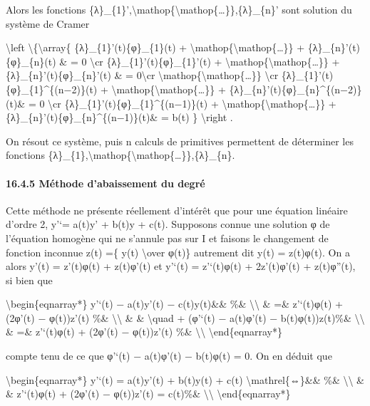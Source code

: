 \documentclass[]{article}
\begin{document}
Alors les fonctions
\{λ\}\_\{1\}',\textbackslash{}mathop\{\textbackslash{}mathop\{\ldots{}\}\},\{λ\}\_\{n\}'
sont solution du système de Cramer

\textbackslash{}left \textbackslash{}\{\textbackslash{}array\{
\{λ\}\_\{1\}'(t)\{φ\}\_\{1\}(t) +
\textbackslash{}mathop\{\textbackslash{}mathop\{\ldots{}\}\} +
\{λ\}\_\{n\}'(t)\{φ\}\_\{n\}(t) \& = 0 \textbackslash{}cr
\{λ\}\_\{1\}'(t)\{φ\}\_\{1\}'(t) +
\textbackslash{}mathop\{\textbackslash{}mathop\{\ldots{}\}\} +
\{λ\}\_\{n\}'(t)\{φ\}\_\{n\}'(t) \& = 0\textbackslash{}cr
\textbackslash{}mathop\{\textbackslash{}mathop\{\ldots{}\}\}
\textbackslash{}cr \{λ\}\_\{1\}'(t)\{φ\}\_\{1\}\^{}\{(n−2)\}(t) +
\textbackslash{}mathop\{\textbackslash{}mathop\{\ldots{}\}\} +
\{λ\}\_\{n\}'(t)\{φ\}\_\{n\}\^{}\{(n−2)\}(t)\& = 0 \textbackslash{}cr
\{λ\}\_\{1\}'(t)\{φ\}\_\{1\}\^{}\{(n−1)\}(t) +
\textbackslash{}mathop\{\textbackslash{}mathop\{\ldots{}\}\} +
\{λ\}\_\{n\}'(t)\{φ\}\_\{n\}\^{}\{(n−1)\}(t)\& = b(t) \}
\textbackslash{}right .

On résout ce système, puis n calculs de primitives permettent de
déterminer les fonctions
\{λ\}\_\{1\},\textbackslash{}mathop\{\textbackslash{}mathop\{\ldots{}\}\},\{λ\}\_\{n\}.

\paragraph{16.4.5 Méthode d'abaissement du degré}

Cette méthode ne présente réellement d'intérêt que pour une équation
linéaire d'ordre 2, y'`= a(t)y' + b(t)y + c(t). Supposons connue une
solution φ de l'équation homogène qui ne s'annule pas sur I et faisons
le changement de fonction inconnue z(t) =\{ y(t) \textbackslash{}over
φ(t)\} autrement dit y(t) = z(t)φ(t). On a alors y'(t) = z'(t)φ(t) +
z(t)φ'(t) et y'`(t) = z'`(t)φ(t) + 2z'(t)φ'(t) + z(t)φ''(t), si bien que

\textbackslash{}begin\{eqnarray*\} y'`(t) − a(t)y'(t) − c(t)y(t)\&\&
\%\& \textbackslash{}\textbackslash{} \& =\& z'`(t)φ(t) + (2φ'(t) −
φ(t))z'(t) \%\& \textbackslash{}\textbackslash{} \& \&
\textbackslash{}quad + (φ'`(t) − a(t)φ'(t) − b(t)φ(t))z(t)\%\&
\textbackslash{}\textbackslash{} \& =\& z'`(t)φ(t) + (2φ'(t) −
φ(t))z'(t) \%\& \textbackslash{}\textbackslash{}
\textbackslash{}end\{eqnarray*\}

compte tenu de ce que φ'`(t) − a(t)φ'(t) − b(t)φ(t) = 0. On en déduit
que

\textbackslash{}begin\{eqnarray*\} y'`(t) = a(t)y'(t) + b(t)y(t) + c(t)
\textbackslash{}mathrel\{⇔\}\&\& \%\& \textbackslash{}\textbackslash{}
\& \& z'`(t)φ(t) + (2φ'(t) − φ(t))z'(t) = c(t)\%\&
\textbackslash{}\textbackslash{} \textbackslash{}end\{eqnarray*\}
\end{document}
